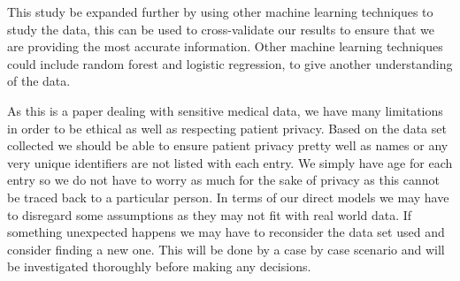 \documentclass[12pt]{article}
\begin{document}
This study be expanded further by using other machine learning techniques to study the data, this can be used to cross-validate our results to ensure
that we are providing the most accurate information. Other machine learning techniques could include random forest and logistic regression, to give another
understanding of the data.

As this is a paper dealing with sensitive medical data, we have many limitations in order to be ethical as well as respecting patient 
privacy. Based on the data set collected we should be able to ensure patient privacy pretty well as names or any very unique identifiers 
are not listed with each entry. We simply have age for each entry so we do not have to worry as much for the sake of privacy as this cannot be traced
back to a particular person. In terms of our direct models we may have to disregard some assumptions as they may not fit with real world data. If something unexpected 
happens we may have to reconsider the data set used and consider finding a new one. This will be done by a case by case scenario and will 
be investigated thoroughly before making any decisions.



\end{document}
